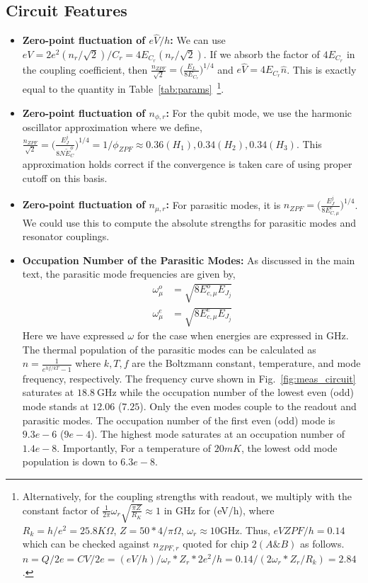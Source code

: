 \documentclass[%
reprint,
superscriptaddress,
 amsmath,amssymb,
 aps,
 prx,
longbibliography,
floatfix,
]{revtex4-2}
\begin{document}
\subsection{Circuit Features}
\begin{itemize}
    \item \textbf{Zero-point fluctuation of $e\hat V/h$:} We can use $eV=2e^2(n_r/\sqrt{2})/C_r=4E_{C_r}(n_r/\sqrt{2})$. If we absorb the factor of $4E_{C_r}$ in the coupling coefficient, then $\frac{n_{ZPF}}{\sqrt{2}}=\Big(\frac{E_L}{8E_{C_r}}\Big)^{1/4}$ and $e\hat V=4E_{C_r}\hat n$. This is exactly equal to the quantity in Table~\ref{tab:params}~\footnote{Alternatively, for the coupling strengths with readout, we multiply with the constant factor of $\frac{1}{2\pi}\omega_r\sqrt{\frac{\pi Z}{R_K}}\approx 1$ in GHz for (eV/h), where $R_k=h/e^2=25.8K\Omega$, $Z=50*4/\pi\Omega$, $\omega_r\approx 10$GHz. Thus, $eVZPF/h=0.14$ which can be checked against $n_{ZPF,r}$ quoted for chip $2(A\&B)$ as follows. $n=Q/2e=CV/2e=(eV/h)/{\omega_r*Z_r*2e^2/h}=0.14/(2\omega_r*Z_r/R_k)=2.84$.}.
    \item \textbf{Zero-point fluctuation of $n_{\phi,r}$:} For the qubit mode, we use the harmonic oscillator approximation where we define, $\frac{n_{ZPF}}{\sqrt{2}}=\Big(\frac{E_J^j}{8N\tilde{E}_{C}^\phi}\Big)^{1/4}=1/\phi_{ZPF}\approx 0.36(H_1), 0.34 (H_2), 0.34 (H_3)$. This approximation holds correct if the convergence is taken care of using proper cutoff on this basis. 
    \item \textbf{Zero-point fluctuation of $n_{\mu,r}$:} For parasitic modes, it is $n_{ZPF}=\Big(\frac{E_J^j}{8E_{C,\mu}^e}\Big)^{1/4}$. We could use this to compute the absolute strengths for parasitic modes and resonator couplings. 

\item\textbf{Occupation Number of the Parasitic Modes:}
As discussed in the main text, the parasitic mode frequencies are given by,
\begin{align}
    \omega^o_\mu&=\sqrt{8E_{c,\mu}^oE_{J_j}}\\
    \omega^e_\mu&=\sqrt{8E_{c,\mu}^eE_{J_j}}
\end{align}
 Here we have expressed $\omega$ for the case when energies are expressed in GHz. The thermal population of the parasitic modes can be calculated as $n=\frac{1}{e^{hf/kT}-1}$ where $k, T, f$ are the Boltzmann constant, temperature, and mode frequency, respectively. The frequency curve shown in Fig.~\ref{fig:meas_circuit} saturates at $18.8 \ \mathrm{GHz}$ while the occupation number of the lowest even (odd) mode stands at $12.06$ ($7.25$). Only the even modes couple to the readout and parasitic modes. The occupation number of the first even (odd) mode is $9.3e-6$ ($9e-4$). The highest mode saturates at an occupation number of $1.4e-8$. Importantly,  For a temperature of $20mK$, the lowest odd mode population is down to $6.3e-8$.

\end{itemize}
\end{document}
